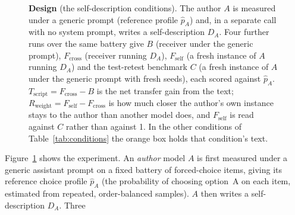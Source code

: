 \documentclass[11pt]{article}
\newcommand{\Fself}{F_{\mathrm{self}}}
\newcommand{\Fcross}{F_{\mathrm{cross}}}
\newcommand{\B}{B}
\newcommand{\Tscript}{T_{\mathrm{script}}}
\newcommand{\Rweight}{R_{\mathrm{weight}}}
\begin{document}
\begin{figure}[H]
\caption{\textbf{Design} (the self-description conditions). The author $A$
is measured under a generic prompt (reference profile $\hat p_A$) and, in a
separate call with no system prompt, writes a self-description $D_A$. Four
further runs over the same battery give $\B$ (receiver under the generic
prompt), $\Fcross$ (receiver running $D_A$), $\Fself$ (a fresh instance of
$A$ running $D_A$) and the test-retest benchmark $C$ (a fresh instance of
$A$ under the generic prompt with fresh seeds), each scored against
$\hat p_A$. $\Tscript = \Fcross - \B$ is the net transfer gain from the
text; $\Rweight = \Fself - \Fcross$ is how much closer the author's own
instance stays to the author than another model does, and $\Fself$ is read
against $C$ rather than against 1. In the other conditions of
Table~\ref{tab:conditions} the orange box holds that condition's text.}
\label{fig:design}
\end{figure}
Figure~\ref{fig:design} shows the experiment. An \emph{author} model $A$ is
first measured under a generic assistant prompt on a fixed battery of
forced-choice items, giving its reference choice profile $\hat p_A$ (the
probability of choosing option~A on each item, estimated from repeated,
order-balanced samples). $A$ then writes a self-description $D_A$. Three
\end{document}
